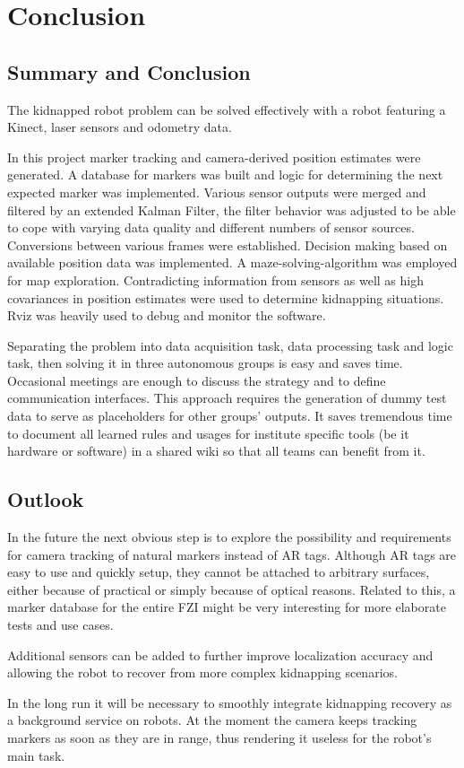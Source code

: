 \chapter{Conclusion}
\section{Summary and Conclusion}
The kidnapped robot problem can be solved effectively with a robot featuring a Kinect, laser sensors and odometry data.

In this project marker tracking and camera-derived position estimates were generated. A database for markers was built and logic for determining the next expected marker was implemented. Various sensor outputs were merged and filtered by an extended Kalman Filter, the filter behavior was adjusted to be able to cope with varying data quality and different numbers of sensor sources. Conversions between various frames were established. Decision making based on available position data was implemented. A maze-solving-algorithm was employed for map exploration. Contradicting information from sensors as well as high covariances in position estimates were used to determine kidnapping situations. Rviz was heavily used to debug and monitor the software.

Separating the problem into data acquisition task, data processing task and logic task, then solving it in three autonomous groups is easy and saves time. Occasional meetings are enough to discuss the strategy and to define communication interfaces. This approach requires the generation of dummy test data to serve as placeholders for other groups' outputs. It saves tremendous time to document all learned rules and usages for institute specific tools (be it hardware or software) in a shared wiki so that all teams can benefit from it.

\section{Outlook}
In the future the next obvious step is to explore the possibility and requirements for camera tracking of natural markers instead of AR tags. Although AR tags are easy to use and quickly setup, they cannot be attached to arbitrary surfaces, either because of practical or simply because of optical reasons. Related to this, a marker database for the entire FZI might be very interesting for more elaborate tests and use cases.

Additional sensors can be added to further improve localization accuracy and allowing the robot to recover from more complex kidnapping scenarios.

In the long run it will be necessary to smoothly integrate kidnapping recovery as a background service on robots. At the moment the camera keeps tracking markers as soon as they are in range, thus rendering it useless for the robot's main task.